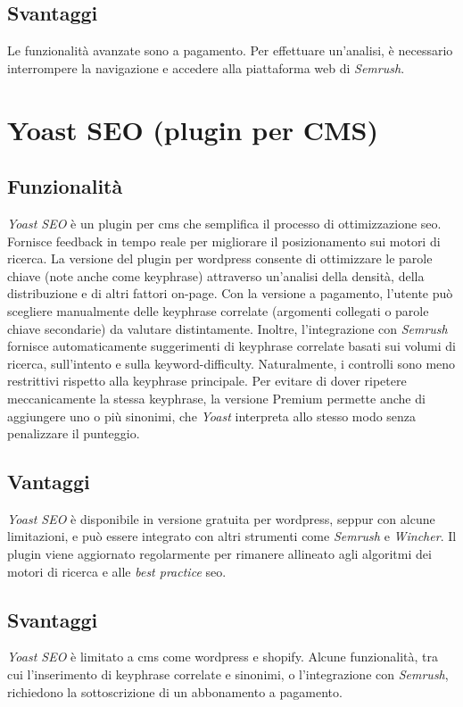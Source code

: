 \subsection{Svantaggi}
Le funzionalità avanzate sono a pagamento. Per effettuare un'analisi, è necessario interrompere la navigazione e accedere alla piattaforma web di \textit{Semrush}.

\section{Yoast SEO (plugin per CMS)}

\subsection{Funzionalità}
\textit{Yoast SEO} è un plugin per \gls{cms} che semplifica il processo di ottimizzazione \gls{seo}. Fornisce feedback in tempo reale per migliorare il posizionamento sui motori di ricerca. La versione del plugin per \gls{wordpress} consente di ottimizzare le parole chiave (note anche come keyphrase) attraverso un'analisi della densità, della distribuzione e di altri fattori \gls{on-page}. Con la versione a pagamento, l'utente può scegliere manualmente delle keyphrase correlate (argomenti collegati o parole chiave secondarie) da valutare distintamente. Inoltre, l'integrazione con \textit{Semrush} fornisce automaticamente suggerimenti di keyphrase correlate basati sui volumi di ricerca, sull'intento e sulla \gls{keyword-difficulty}. Naturalmente, i controlli sono meno restrittivi rispetto alla keyphrase principale. Per evitare di dover ripetere meccanicamente la stessa keyphrase, la versione Premium permette anche di aggiungere uno o più sinonimi, che \textit{Yoast} interpreta allo stesso modo senza penalizzare il punteggio.

\subsection{Vantaggi}
\textit{Yoast SEO} è disponibile in versione gratuita per \gls{wordpress}, seppur con alcune limitazioni, e può essere integrato con altri strumenti come \textit{Semrush} e \textit{Wincher}. Il plugin viene aggiornato regolarmente per rimanere allineato agli algoritmi dei motori di ricerca e alle \textit{best practice} \gls{seo}.

\subsection{Svantaggi}
\textit{Yoast SEO} è limitato a \gls{cms} come \gls{wordpress} e \gls{shopify}. Alcune funzionalità, tra cui l'inserimento di keyphrase correlate e sinonimi, o l'integrazione con \textit{Semrush}, richiedono la sottoscrizione di un abbonamento a pagamento.

